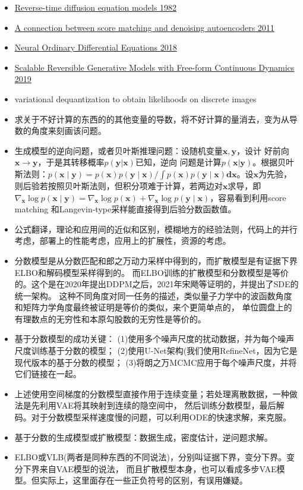 \begin{itemize}
  \item \href{B.D}{Reverse-time diffusion equation models 1982}
  \item \href{c.c}{A connection between score matching and denoising autoencoders 2011} 
  \item \href{n.c}{Neural Ordinary Differential Equations 2018}
  \item \href{s.c}{Scalable Reversible Generative Models with Free-form Continuous Dynamics 2019}
  \item variational dequantization to obtain likelihoods on discrete images
  \item 求关于不好计算的东西的的其他变量的导数，将不好计算的量消去，变为从导数的角度来刻画该问题。
  \item 生成模型的逆向问题，或者贝叶斯推理问题：设随机变量$\mathbf{x}, \mathbf{y}$，设计
  好前向$\mathbf{x} \rightarrow \mathbf{y}$，于是其转移概率$p(\mathbf{y}|\mathbf{x})$已知，逆向
  问题是计算$p(\mathbf{x}|\mathbf{y})$。根据贝叶斯法则：$p(\mathbf{x} \mid \mathbf{y})=p(\mathbf{x}) p(\mathbf{y} 
  \mid \mathbf{x}) / \int p(\mathbf{x}) p(\mathbf{y} \mid \mathbf{x}) \mathbf{d} \mathbf{x}$。设$\mathbf{x}$为先验，
  则后验若按照贝叶斯法则，但积分项难于计算，若两边对$\mathbf{x}$求导，即$\nabla_{\mathbf{x}} \log p(\mathbf{x} \mid \mathbf{y})=\nabla_{\mathbf{x}} \log p(\mathbf{x})+\nabla_{\mathbf{x}} \log p(\mathbf{y} \mid \mathbf{x})$，容易看到利用score matching 和Langevin-type采样能直接得到后验分数函数值。
  \item 公式翻译，理论和应用间的近似和区别，模糊地方的经验法则，代码上的并行考虑，部署上的性能考虑，应用上的扩展性，资源的考虑。
  \item 分数模型是从分数匹配和郎之万动力采样中得到的，而扩散模型是有证据下界ELBO和解码模型采样得到的。
  而ELBO训练的扩散模型和分数模型是等价的。这个是在2020年提出DDPM之后，2021年宋飏等证明的，并提出了SDE的统一架构。
  这种不同角度对同一任务的描述，类似量子力学中的波函数角度和矩阵力学角度最终被证明是等价的类似，来个更简单点的，
  单位圆盘上的有理数点的无穷性和本原勾股数的无穷性是等价的。
  \item 基于分数模型的成功关键：
  (1)使用多个噪声尺度的扰动数据，并为每个噪声尺度训练基于分数的模型；
  (2)使用U-Net架构(我们使用RefineNet，因为它是现代版本的基于分数的模型；
  (3)将朗之万MCMC应用于每个噪声尺度，并将它们链接在一起。
  \item 上述使用空间梯度的分数模型直接作用于连续变量；若处理离散数据，一种做法是先利用VAE将其映射到连续的隐空间中，
  然后训练分数模型，最后解码。对于分数模型采样速度慢的问题，可以利用ODE的快速求解，来克服。 
  \item 基于分数的生成模型或扩散模型：数据生成，密度估计，逆问题求解。
  \item ELBO或VLB(两者是同种东西的不同说法)，分别叫证据下界，变分下界。变分下界来自VAE模型的说法，
  而且扩散模型本身，也可以看成多步VAE模型。但实际上，这里面存在一些正负符号的区别，有误用嫌疑。
  

\end{itemize}
